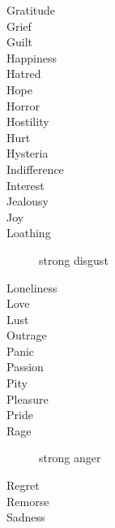 \begin{multicols}{2}
\begin{description}
\item[Gratitude]

\item[Grief]

\item[Guilt]

\item[Happiness]

\item[Hatred]

\item[Hope]

\item[Horror]

\item[Hostility]

\item[Hurt]

\item[Hysteria]

\item[Indifference]

\item[Interest]

\item[Jealousy]

\item[Joy]

\item[Loathing]
strong disgust
\item[Loneliness]

\item[Love]

\item[Lust]

\item[Outrage]

\item[Panic]

\item[Passion]

\item[Pity]

\item[Pleasure]

\item[Pride]

\item[Rage]
strong anger
\item[Regret]

\item[Remorse]

\item[Sadness]


\end{description}
\end{multicols}
